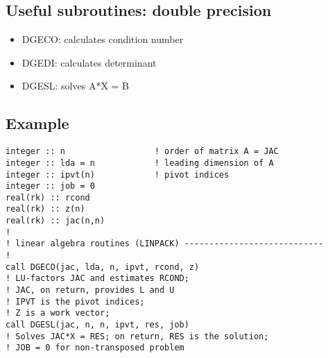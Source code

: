\documentclass[11pt]{article}
\begin{document}
\subsection{Useful subroutines: double precision}
\label{sec:org8da3aed}
\begin{itemize}
\item DGECO: calculates condition number
\item DGEDI: calculates determinant
\item DGESL: solves A*X = B
\end{itemize}
\subsection{Example}
\label{sec:org6eb6ca4}
\begin{verbatim}
integer :: n                  ! order of matrix A = JAC
integer :: lda = n            ! leading dimension of A
integer :: ipvt(n)            ! pivot indices
integer :: job = 0
real(rk) :: rcond
real(rk) :: z(n)
real(rk) :: jac(n,n)
!
! linear algebra routines (LINPACK) ----------------------------
!
call DGECO(jac, lda, n, ipvt, rcond, z)
! LU-factors JAC and estimates RCOND;
! JAC, on return, provides L and U
! IPVT is the pivot indices;
! Z is a work vector;
call DGESL(jac, n, n, ipvt, res, job)
! Solves JAC*X = RES; on return, RES is the solution;
! JOB = 0 for non-transposed problem
\end{verbatim}
\end{document}
